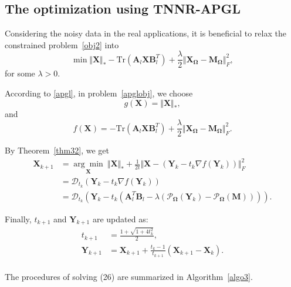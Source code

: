 \documentclass{article}
\begin{document}
{\subsection{The optimization using TNNR-APGL}
Considering the noisy data in the real applications, it is beneficial to relax the constrained problem~\eqref{obj2} into
\begin{equation}
    \min \Vert\mathbf X \Vert_* - \text{Tr}(\mathbf A_l\mathbf X\mathbf B_l^T) + \frac{\lambda}{2}\Vert\mathbf X_{\mathbf\Omega} -\mathbf M_{\mathbf\Omega} \Vert^2_F,
    \label{apglobj}
\end{equation}
for some $\lambda >0$.

According to \eqref{apgl}, in problem~\eqref{apglobj}, we choose
\begin{equation*}
    g(\mathbf X) = \Vert\mathbf X \Vert_*,
\end{equation*}
and
\begin{equation*}
    f(\mathbf X) = - \text{Tr}(\mathbf A_l\mathbf X\mathbf B_l^T) + \frac{\lambda}{2}\Vert\mathbf X_{\mathbf\Omega} -\mathbf M_{\mathbf\Omega} \Vert^2_F.
\end{equation*}

By Theorem~\ref{thm32}, we get
\begin{equation}
    \begin{aligned}
        \mathbf X_{k+1} & = \underset{\mathbf X}{\arg\min}\  \Vert\mathbf X \Vert_* + \frac{1}{2t}\Vert\mathbf X- (\mathbf Y_k -t_k \nabla f(\mathbf Y_k))\Vert_F^2 \\
        & = \mathcal{D}_{t_k}(\mathbf Y_k - t_k\nabla f(\mathbf Y_k)) \\
        & = \mathcal{D}_{t_k}(\mathbf Y_k - t_k(\mathbf A_l^T\mathbf B_l - \lambda(\mathcal{P}_{\mathbf\Omega}(\mathbf Y_k)- \mathcal{P}_{\mathbf\Omega}(\mathbf M)))).
    \end{aligned}
\end{equation}

Finally, $t_{k+1}$ and $\mathbf Y_{k+1}$ are updated as:
\begin{equation}
    \begin{aligned}
        t_{k+1} & = \frac{1+\sqrt{1+4t^2_k}}{2}, \\
        \mathbf Y_{k+1}& = \mathbf X_{k+1} +\frac{t_{k}-1}{t_{k+1}}(\mathbf X_{k+1}-\mathbf X_{k}). \\
    \end{aligned}
\end{equation}

The procedures of solving (26) are summarized in Algorithm~\ref{algo3}.

}
\end{document}
